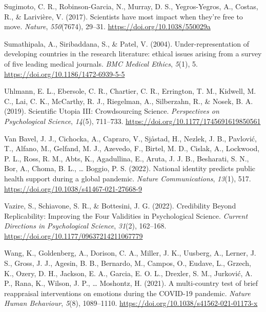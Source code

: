 \documentclass[
  man,floatsintext]{apa7}
\newlength{\cslhangindent}
\newenvironment{CSLReferences}[2] %
 {\begin{list}{}{%
  \setlength{\itemindent}{0pt}
  \setlength{\leftmargin}{0pt}
  \setlength{\parsep}{0pt}
  \ifodd #1
   \setlength{\leftmargin}{\cslhangindent}
   \setlength{\itemindent}{-1\cslhangindent}
  \fi
  \setlength{\itemsep}{#2\baselineskip}}}
 {\end{list}}
\begin{document}
\begin{CSLReferences}{1}{0}
Sugimoto, C. R., Robinson-Garcia, N., Murray, D. S., Yegros-Yegros, A., Costas, R., \& Larivière, V. (2017). Scientists have most impact when they're free to move. \emph{Nature}, \emph{550}(7674), 29--31. \url{https://doi.org/10.1038/550029a}

Sumathipala, A., Siribaddana, S., \& Patel, V. (2004). Under-representation of developing countries in the research literature: ethical issues arising from a survey of five leading medical journals. \emph{BMC Medical Ethics}, \emph{5}(1), 5. \url{https://doi.org/10.1186/1472-6939-5-5}

Uhlmann, E. L., Ebersole, C. R., Chartier, C. R., Errington, T. M., Kidwell, M. C., Lai, C. K., McCarthy, R. J., Riegelman, A., Silberzahn, R., \& Nosek, B. A. (2019). Scientific Utopia III: Crowdsourcing Science. \emph{Perspectives on Psychological Science}, \emph{14}(5), 711--733. \url{https://doi.org/10.1177/1745691619850561}

Van Bavel, J. J., Cichocka, A., Capraro, V., Sjåstad, H., Nezlek, J. B., Pavlović, T., Alfano, M., Gelfand, M. J., Azevedo, F., Birtel, M. D., Cislak, A., Lockwood, P. L., Ross, R. M., Abts, K., Agadullina, E., Aruta, J. J. B., Besharati, S. N., Bor, A., Choma, B. L., \ldots{} Boggio, P. S. (2022). National identity predicts public health support during a global pandemic. \emph{Nature Communications}, \emph{13}(1), 517. \url{https://doi.org/10.1038/s41467-021-27668-9}

Vazire, S., Schiavone, S. R., \& Bottesini, J. G. (2022). Credibility Beyond Replicability: Improving the Four Validities in Psychological Science. \emph{Current Directions in Psychological Science}, \emph{31}(2), 162--168. \url{https://doi.org/10.1177/09637214211067779}

Wang, K., Goldenberg, A., Dorison, C. A., Miller, J. K., Uusberg, A., Lerner, J. S., Gross, J. J., Agesin, B. B., Bernardo, M., Campos, O., Eudave, L., Grzech, K., Ozery, D. H., Jackson, E. A., Garcia, E. O. L., Drexler, S. M., Jurković, A. P., Rana, K., Wilson, J. P., \ldots{} Moshontz, H. (2021). A multi-country test of brief reappraisal interventions on emotions during the COVID-19 pandemic. \emph{Nature Human Behaviour}, \emph{5}(8), 1089--1110. \url{https://doi.org/10.1038/s41562-021-01173-x}


\end{CSLReferences}
\end{document}
